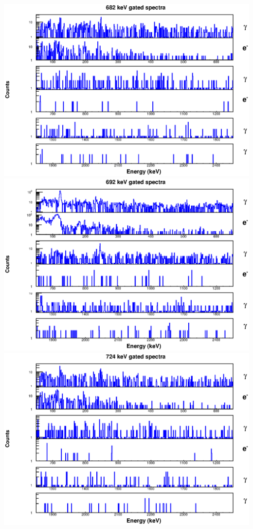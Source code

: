 \includegraphics[scale=0.8]{154Gd_Appendix/682_combined.eps}
\includegraphics[scale=0.8]{154Gd_Appendix/692_combined.eps}
\includegraphics[scale=0.8]{154Gd_Appendix/724_combined.eps}
